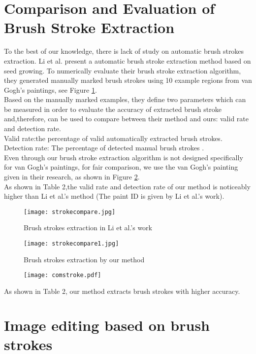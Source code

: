 \section{Comparison and Evaluation of Brush Stroke Extraction} \label{comparevan}
To the best of our knowledge, there is lack of study on automatic brush strokes extraction. Li et al.\cite{li2012rhythmic} present a automatic brush stroke extraction method based on seed growing. To numerically evaluate their brush stroke extraction algorithm, they generated manually marked brush strokes using 10 example regions from van Gogh's paintings, see Figure \ref{liswork}. \\ 
Based on the manually marked examples, they define two parameters which can be measured in order to evaluate the accuracy of extracted brush stroke and,therefore, can be used to compare between their method and ours: valid rate and detection rate.\\
Valid rate:the percentage of valid automatically extracted brush strokes. \\ Detection rate: The percentage of detected manual brush strokes . \\
Even through our brush stroke extraction algorithm is not designed specifically for van Gogh's paintings, for fair comparison, we use the van Gogh's painting given in their research, as shown in Figure \ref{vanourwork}.\\
As shown in Table 2,the valid rate and detection rate of our method is noticeably higher than Li et al.'s method \cite{li2012rhythmic} (The paint ID is given by Li et al.'s work). 
\begin{figure}[H]
	\texttt{[image: strokecompare.jpg]}
	\caption{Brush strokes extraction in Li et al.'s work}
	\label{liswork}
\end{figure}
\begin{figure}[H]
	\texttt{[image: strokecompare1.jpg]}
	\caption{Brush strokes extraction by our method}
	\label{vanourwork}
\end{figure}


\begin{figure}[H]
	\texttt{[image: comstroke.pdf]}
	\label{table2}
\end{figure}
As shown in Table 2, our method extracts brush strokes with higher accuracy.





\section{Image editing based on brush strokes}\label{editing}

